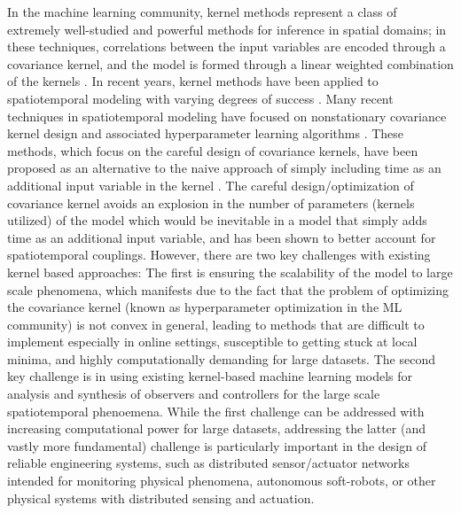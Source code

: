 In the machine learning community, kernel methods represent a class of extremely well-studied and powerful methods for inference in spatial domains; in these techniques, correlations between the input variables are encoded through a covariance kernel, and the model is formed through a linear weighted combination of the kernels \cite{RasmussenWilliams2005,schoelkopf01kernelbased,scholkopf2002learning}. In recent years, kernel methods have been applied to spatiotemporal modeling with varying degrees of success \cite{cressie2011statistics,RasmussenWilliams2005}. Many recent techniques in spatiotemporal modeling have focused on nonstationary covariance kernel design and associated hyperparameter learning algorithms \cite{garg2012AAAI,ma2003nonstationary,plagemann2008nonstationary}. These methods, which focus on the careful design of covariance kernels,  have been proposed as an alternative to the naive approach of  simply including time as an additional input variable in the kernel \cite{Chowdhary13_CDC1}. The careful design/optimization of covariance kernel avoids an explosion in the number of parameters (kernels utilized) of the model which would be inevitable in a model that simply adds time as an additional input variable, and has been shown to better account for spatiotemporal couplings. However, there are two key challenges with existing kernel based approaches: The first is ensuring the scalability of the model to large scale phenomena, which manifests due to the fact that the problem of optimizing the covariance kernel (known as hyperparameter optimization in the ML community) is not convex in general, leading to methods that are difficult to implement especially in online settings, susceptible to getting stuck at local minima, and highly computationally demanding for large datasets. %
The second key challenge is in using existing kernel-based machine learning models for analysis and synthesis of observers and controllers for the large scale spatiotemporal phenoemena. While the first challenge can be addressed with increasing computational power for large datasets, addressing the latter (and vastly more fundamental) challenge is particularly important in the design of reliable engineering systems, such as distributed sensor/actuator networks intended for monitoring physical phenomena, autonomous soft-robots, or other physical systems with distributed sensing and actuation.  %
% 
   
